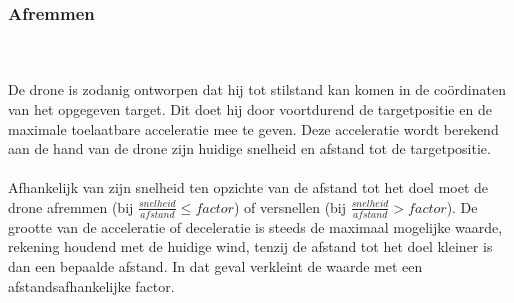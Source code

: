 \subsubsection{Afremmen}
\\
\\
De drone is zodanig ontworpen dat hij tot stilstand kan komen in de co\"ordinaten van het opgegeven target. Dit doet hij door voortdurend de targetpositie en de maximale toelaatbare acceleratie mee te geven. Deze acceleratie wordt berekend aan de hand van de drone zijn huidige snelheid en afstand tot de targetpositie.
\\
\\
Afhankelijk van zijn snelheid ten opzichte van de afstand tot het doel moet de drone afremmen (bij $\frac{snelheid}{afstand}  \leq factor$) of versnellen (bij $\frac{snelheid}{afstand}  > factor$). De grootte van de acceleratie of deceleratie is steeds de maximaal mogelijke waarde, rekening houdend met de huidige wind, tenzij de afstand tot het doel kleiner is dan een bepaalde afstand. In dat geval verkleint de waarde met een afstandsafhankelijke factor.